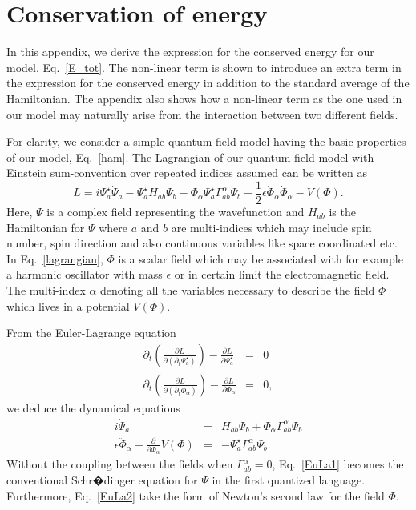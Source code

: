 \documentclass[showpacs,preprintnumbers,amsmath,amssymb,12pt]{revtex4-2}
\begin{document}
\appendix

\section{Conservation of energy}
\label{App:energy}

In this appendix, we derive the expression for the conserved energy
for our model, Eq.~\eqref{E_tot}. The non-linear term is shown to
introduce an extra term in the expression for the conserved energy in
addition to the standard average of the Hamiltonian. The appendix also
shows how a non-linear term as the one used in our model may naturally
arise from the interaction between two different fields.

For clarity, we consider a simple quantum field model having the basic
properties of our model, Eq.~\eqref{ham}. The Lagrangian of our
quantum field model with Einstein sum-convention over repeated indices
assumed can be written as
\begin{equation}
  L=i\Psi_a^{\star} \dot{\Psi}_a - \Psi_a^{\star} H_{ab}\Psi_b - 
  \Phi_{\alpha} \Psi_a^{\star}\Gamma_{ab}^\alpha \Psi_b
  +\frac{1}{2}\epsilon \dot{\Phi}_\alpha \dot{\Phi}_\alpha-V(\Phi).
  \label{lagrangian}
\end{equation} 
Here, $\Psi$ is a complex field representing the wavefunction and
$H_{ab}$ is the Hamiltonian for $\Psi$ where $a$ and $b$ are
multi-indices which may include spin number, spin direction and also
continuous variables like space coordinated etc. In
Eq.~\eqref{lagrangian}, $\Phi$ is a scalar field which may be
associated with for example a harmonic oscillator with mass $\epsilon$
or in certain limit the electromagnetic field. The multi-index
$\alpha$ denoting all the variables necessary to describe the field
$\Phi$ which lives in a potential $V(\Phi)$.

From the Euler-Lagrange equation
\begin{eqnarray}
  \partial_t \left(\frac{\partial L}{\partial(\partial_t \Psi_a^{\star})}\right)
  -\frac{\partial L}{\partial \Psi_a^{\star}} &=&0  \\
  \partial_t \left(\frac{\partial L}{\partial(\partial_t \Phi_{\alpha})}\right)
  -\frac{\partial L}{\partial \Phi_{\alpha}} &=&0,
  \label{eulerlagrange1}
\end{eqnarray}
we deduce the dynamical equations
\begin{eqnarray}
  i\dot{\Psi}_a &=& H_{ab}\Psi_b+\Phi_{\alpha}\Gamma_{ab}^{\alpha} \Psi_b 
\label{EuLa1}
\\
  \epsilon \ddot{\Phi}_{\alpha} +\frac{\partial}{\partial\Phi_{\alpha}} 
  V(\Phi)&=& -\Psi_{a}^{\star}\Gamma_{ab}^{\alpha} \Psi_b
\label{EuLa2}.
\end{eqnarray}
Without the coupling between the fields when $\Gamma_{ab}^\alpha = 0$,
Eq.~\eqref{EuLa1} becomes the conventional Schr�dinger equation for
$\Psi$ in the first quantized language. Furthermore, Eq.~\eqref{EuLa2}
take the form of Newton's second law for the field $\Phi$.
\end{document}
